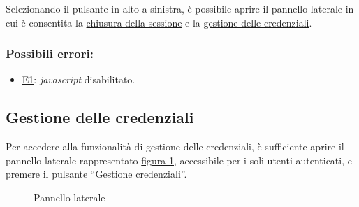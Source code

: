 Selezionando il pulsante in alto a sinistra, è possibile aprire il pannello laterale in cui è consentita la \hyperref[logout]{chiusura della sessione} e la \hyperref[userdata]{gestione delle credenziali}.

\subsubsection*{Possibili errori:}
\begin{itemize}
\item \hyperref[e1]{E1}: \textit{javascript} disabilitato.
\end{itemize}

\subsection{Gestione delle credenziali}
\label{userdata}

Per accedere alla funzionalità di gestione delle credenziali, è sufficiente aprire il pannello laterale rappresentato \hyperref[fig:Flogout]{figura \ref{fig:Flogout}}, accessibile per i soli utenti autenticati, e premere il pulsante ``Gestione credenziali''.

\begin{figure}[H] \centering 
{} \caption{Pannello laterale}
\label{fig:Flogout}
\end{figure}

